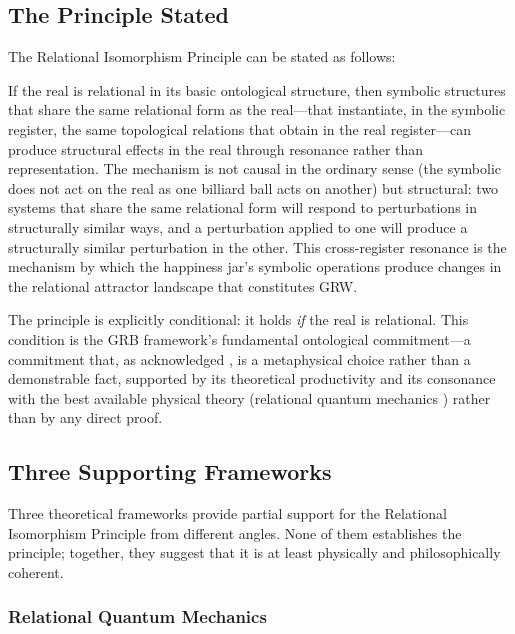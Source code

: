 \subsection{The Principle Stated}
\label{p15:subsec:principle_stated}

\noindent
The Relational Isomorphism Principle can be stated as follows:

\begin{claim}
If the real is relational in its basic ontological structure, then symbolic structures that share the same relational form as the real---that instantiate, in the symbolic register, the same topological relations that obtain in the real register---can produce structural effects in the real through resonance rather than representation. The mechanism is not causal in the ordinary sense (the symbolic does not act on the real as one billiard ball acts on another) but structural: two systems that share the same relational form will respond to perturbations in structurally similar ways, and a perturbation applied to one will produce a structurally similar perturbation in the other. This cross-register resonance is the mechanism by which the happiness jar's symbolic operations produce changes in the relational attractor landscape that constitutes GRW.
\end{claim}

The principle is explicitly conditional: it holds \emph{if} the real is relational. This condition is the GRB framework's fundamental ontological commitment---a commitment that, as  acknowledged \parencite{paperxiv}, is a metaphysical choice rather than a demonstrable fact, supported by its theoretical productivity and its consonance with the best available physical theory (relational quantum mechanics \parencite{rovelli1996}) rather than by any direct proof.

\subsection{Three Supporting Frameworks}
\label{p15:subsec:supporting}

\noindent
Three theoretical frameworks provide partial support for the Relational Isomorphism Principle from different angles. None of them establishes the principle; together, they suggest that it is at least physically and philosophically coherent.

\subsubsection{Relational Quantum Mechanics}
\label{p15:subsubsec:rqm}

